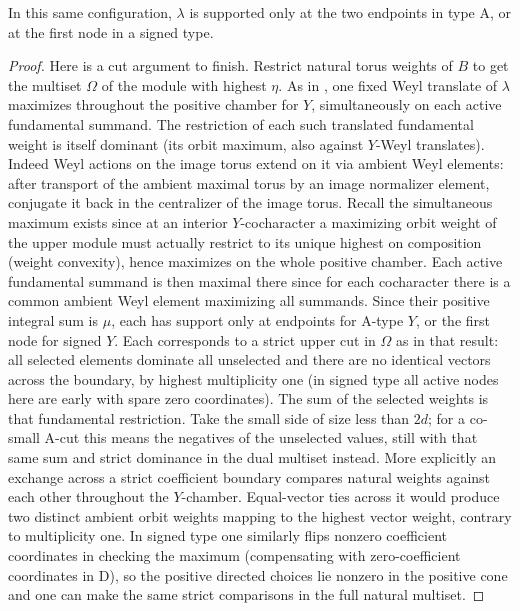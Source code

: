 \begin{lemma}
\label{fb:endpoint-cuts}
In this same configuration, \(\lambda\) is supported only at the two
endpoints in type A, or at the first node in a signed type.
\end{lemma}
\begin{proof}

Here is a cut argument to finish. Restrict natural torus weights of \(B\) to get the multiset \(\Omega\) of the module with highest \(\eta\). As in , one fixed Weyl translate of \(\lambda\) maximizes throughout the positive chamber for \(Y\), simultaneously on each active fundamental summand. The restriction of each such translated fundamental weight is itself dominant (its orbit maximum, also against \(Y\)-Weyl translates). Indeed Weyl actions on the image torus extend on it via ambient Weyl elements: after transport of the ambient maximal torus by an image normalizer element, conjugate it back in the centralizer of the image torus. Recall the simultaneous maximum exists since at an interior \(Y\)-cocharacter a maximizing orbit weight of the upper module must actually restrict to its unique highest on composition (weight convexity), hence maximizes on the whole positive chamber. Each active fundamental summand is then maximal there since for each cocharacter there is a common ambient Weyl element maximizing all summands. Since their positive integral sum is \(\mu\), each has support only at endpoints for A-type \(Y\), or the first node for signed \(Y\). Each corresponds to a strict upper cut in \(\Omega\) as in that result: all selected elements dominate all unselected and there are no identical vectors across the boundary, by highest multiplicity one (in signed type all active nodes here are early with spare zero coordinates). The sum of the selected weights is that fundamental restriction. Take the small side of size less than \(2d\); for a co-small A-cut this means the negatives of the unselected values, still with that same sum and strict dominance in the dual multiset instead. More explicitly an exchange across a strict coefficient boundary compares natural weights against each other throughout the \(Y\)-chamber. Equal-vector ties across it would produce two distinct ambient orbit weights mapping to the highest vector weight, contrary to multiplicity one. In signed type one similarly flips nonzero coefficient coordinates in checking the maximum (compensating with zero-coefficient coordinates in D), so the positive directed choices lie nonzero in the positive cone and one can make the same strict comparisons in the full natural multiset.


\end{proof}
